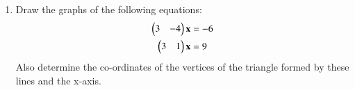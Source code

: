 \renewcommand{\theequation}{\theenumi}
\begin{enumerate}[label=\thesection.\arabic*.,ref=\thesection.\theenumi]

\item Draw the graphs of the following equations: 
\begin{align}\label{linform/2006/2/11/eq:1}
    \begin{pmatrix}3&-4\end{pmatrix}\mathbf{x}&=-6
    \\
\label{linform/2006/2/11/eq:2}
    \begin{pmatrix}3&1\end{pmatrix}\mathbf{x}&=9
\end{align}Also determine the co-ordinates of the vertices of the triangle formed by these lines and the x-axis.
\\
\solution


\end{enumerate}